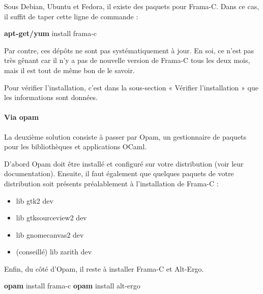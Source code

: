 \documentclass[12pt,francais,]{scrbook}
\newenvironment{Shaded}{}{}
\newcommand{\KeywordTok}[1]{\textcolor[rgb]{0.00,0.44,0.13}{\textbf{{#1}}}}
\newcommand{\NormalTok}[1]{{#1}}
\providecommand{\tightlist}{%
  \setlength{\itemsep}{0pt}\setlength{\parskip}{0pt}}
\begin{document}
Sous Debian, Ubuntu et Fedora, il existe des paquets pour Frama-C. Dans
ce cas, il suffit de taper cette ligne de commande :

\begin{footnotesize}\begin{Shaded}
\begin{Highlighting}[]
\KeywordTok{apt-get/yum} \NormalTok{install frama-c}
\end{Highlighting}
\end{Shaded}\end{footnotesize}

Par contre, ces dépôts ne sont pas systématiquement à jour. En soi, ce
n'est pas très gênant car il n'y a pas de nouvelle version de Frama-C
tous les deux mois, mais il est tout de même bon de le savoir.

Pour vérifier l'installation, c'est dans la sous-section « Vérifier
l'installation » que les informations sont données.

\paragraph{Via opam}\label{via-opam}

La deuxième solution consiste à passer par Opam, un gestionnaire de
paquets pour les bibliothèques et applications OCaml.

D'abord Opam doit être installé et configuré sur votre distribution
(voir leur documentation). Ensuite, il faut également que quelques
paquets de votre distribution soit présents préalablement à
l'installation de Frama-C :

\begin{itemize}
\tightlist
\item
  lib gtk2 dev
\item
  lib gtksourceview2 dev
\item
  lib gnomecanvas2 dev
\item
  (conseillé) lib zarith dev
\end{itemize}

Enfin, du côté d'Opam, il reste à installer Frama-C et Alt-Ergo.

\begin{footnotesize}\begin{Shaded}
\begin{Highlighting}[]
\KeywordTok{opam} \NormalTok{install frama-c}
\KeywordTok{opam} \NormalTok{install alt-ergo}
\end{Highlighting}
\end{Shaded}\end{footnotesize}
\end{document}
